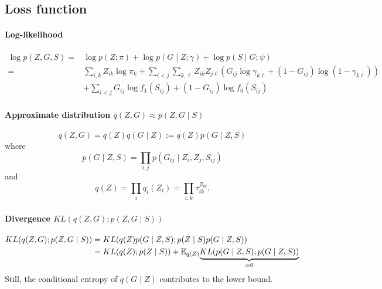 \subsection{Loss function}

\paragraph{Log-likelihood}
\begin{align*}
 \log p(Z, G, S) 
 = & \log p(Z; \pi) + \log p(G \mid Z; \gamma) + \log p(S \mid G; \psi) \\
 = & \sum_{i, k} Z_{ik} \log \pi_k 
 + \sum_{i < j} \sum_{k, \ell} Z_{ik} Z_{j\ell} \left(G_{ij} \log \gamma_{k\ell} + (1 - G_{ij}) \log (1 - \gamma_{k\ell})\right) \\
 & + \sum_{i < j} G_{ij} \log f_1(S_{ij}) + (1 - G_{ij}) \log f_0(S_{ij})
\end{align*}

\paragraph{Approximate distribution $q(Z, G) \approx p(Z, G \mid S)$}
\begin{equation}
q(Z, G) = q(Z) q(G \mid Z) := q(Z) p(G \mid Z, S)
\end{equation}
where
$$
p(G \mid Z, S) = \prod_{i, j} p(G_{ij} \mid Z_i, Z_j, S_{ij})
$$
and
$$
q(Z) = \prod_i q_i(Z_i) = \prod_{i, k} \tau_{ik}^{Z_{ik}}.
$$

\paragraph{Divergence $KL(q(Z, G) ; p(Z, G \mid S))$}
\begin{align*}
KL(q(Z, G) ; p(Z, G \mid S)) 
& = KL(q(Z) p(G \mid Z, S); p(Z \mid S) p(G \mid Z, S)) \\
& = KL(q(Z); p(Z \mid S)) 
+ \mathbb E_{q(Z)} \underset{=0}{\underbrace{KL(p(G \mid Z, S); p(G \mid Z, S))}}
\end{align*}
Still, the conditional entropy of $q(G \mid Z)$ contributes to the lower bound.

